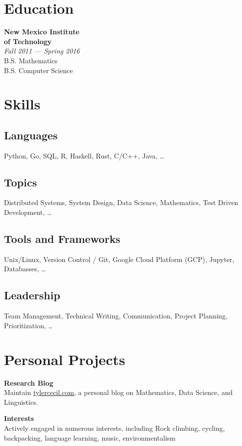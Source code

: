 \documentclass{tc_cv}
\begin{document}

\begin{minipage}[t]{0.3\linewidth}


\vspace{2em}
\section{Education}
\textbf{New Mexico Institute \\ of Technology}\\
\textsl{Fall 2011 --- Spring 2016}\\
  \faGraduationCap \hspace{1ex} B.S. Mathematics\\
  \faGraduationCap \hspace{1ex} B.S. Computer Science

\vspace{2em}
\section{Skills}
\subsection{Languages}
Python,
Go,
SQL,
R,
Haskell,
Rust,
C/C++,
Java,
\ldots

\subsection{Topics}
Distributed Systems,
System Design,
Data Science,
Mathematics,
Test Driven Development,
\ldots

\subsection{Tools and Frameworks}
Unix/Linux,
Version Control / Git,
Google Cloud Platform (GCP),
Jupyter,
Databasses,
\ldots

\subsection{Leadership}
Team Management,
Technical Writing,
Communication,
Project Planning,
Prioritization,
\ldots

\vspace{2em}
\section{Personal Projects}
\textbf{Research Blog}\\
Maintain \href{https://tylercecil.com}{tylercecil.com}, a personal blog on
  Mathematics, Data Science, and Linguistics.

\textbf{Interests}\\
Actively engaged in numerous interests, including
Rock climbing, cycling, backpacking, language learning, music,
environmentalism

\end{minipage}
\end{document}

